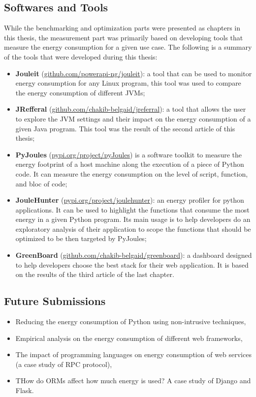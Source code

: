 \subsection{Softwares and Tools}
While the benchmarking and optimization parts were presented as chapters in this thesis, the measurement part was primarily based on developing tools that measure the energy consumption for a given use case.
The following is a summary of the tools that were developed during this thesis:
\begin{itemize}
      \item \textbf{Jouleit} (\url{github.com/powerapi-ng/jouleit}): a tool that can be used to monitor energy consumption for any Linux program, this tool was used to compare the energy consumption of different JVMs;
      \item \textbf{JRefferal} (\url{github.com/chakib-belgaid/jreferral}): a tool that allows the user to explore the JVM settings and their impact on the energy consumption of a given Java program. This tool was the result of the second article of this thesis;
      \item \textbf{PyJoules} (\url{pypi.org/project/pyJoules}) is a software toolkit to measure the energy footprint of a host machine along the execution of a piece of Python code. It can measure the energy consumption on the level of script, function, and bloc of code;
      \item \textbf{JouleHunter} (\url{pypi.org/project/joulehunter}): an energy profiler for python applications. It can be used to highlight the functions that consume the most energy in a given Python program. Its main usage is to help developers do an exploratory analysis of their application to scope the functions that should be optimized to be then targeted by PyJoules;
      \item \textbf{GreenBoard} (\url{github.com/chakib-belgaid/greenboard}): a dashboard designed to help developers choose the best stack for their web application. It is based on the results of the third article of the last chapter.
\end{itemize}



\subsection{Future Submissions}
\begin{itemize}
      \item Reducing the energy consumption of Python using non-intrusive techniques,
      \item Empirical analysis on the energy consumption of different web frameworks,
      \item The impact of programming languages on energy consumption of web services (a case study of RPC protocol),
      \item THow do ORMs affect how much energy is used? A case study of Django and Flask.
\end{itemize}

